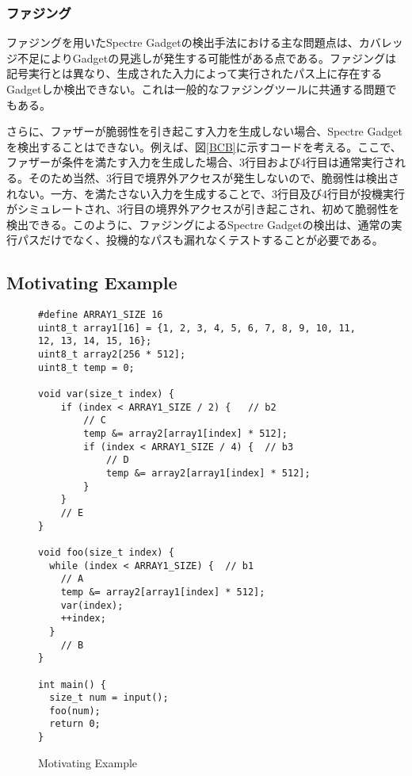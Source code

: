 \subsubsection{ファジング}
ファジングを用いたSpectre Gadgetの検出手法における主な問題点は、カバレッジ不足によりGadgetの見逃しが発生する可能性がある点である。ファジングは記号実行とは異なり、生成された入力によって実行されたパス上に存在するGadgetしか検出できない。これは一般的なファジングツールに共通する問題でもある。\par
さらに、ファザーが脆弱性を引き起こす入力を生成しない場合、Spectre Gadgetを検出することはできない。例えば、図\ref{BCB}に示すコードを考える。ここで、ファザーが条件を満たす入力を生成した場合、3行目および4行目は通常実行される。そのため当然、3行目で境界外アクセスが発生しないので、脆弱性は検出されない。一方、を満たさない入力を生成することで、3行目及び4行目が投機実行がシミュレートされ、3行目の境界外アクセスが引き起こされ、初めて脆弱性を検出できる。このように、ファジングによるSpectre Gadgetの検出は、通常の実行パスだけでなく、投機的なパスも漏れなくテストすることが必要である。\par

\subsection{Motivating Example}
\label{sec:MotivatingExample}

\begin{figure}
  \begin{verbatim}
#define ARRAY1_SIZE 16
uint8_t array1[16] = {1, 2, 3, 4, 5, 6, 7, 8, 9, 10, 11, 12, 13, 14, 15, 16};
uint8_t array2[256 * 512];
uint8_t temp = 0;

void var(size_t index) {
    if (index < ARRAY1_SIZE / 2) {   // b2
        // C
        temp &= array2[array1[index] * 512];
        if (index < ARRAY1_SIZE / 4) {  // b3
            // D
            temp &= array2[array1[index] * 512];
        }
    }
    // E
}

void foo(size_t index) {
  while (index < ARRAY1_SIZE) {  // b1
    // A
    temp &= array2[array1[index] * 512];
    var(index);
    ++index;
  }
    // B
}

int main() {
  size_t num = input();
  foo(num);
  return 0;
}
   \end{verbatim}
  \caption{Motivating Example}
  \label{MotivatingExample}
\end{figure}

